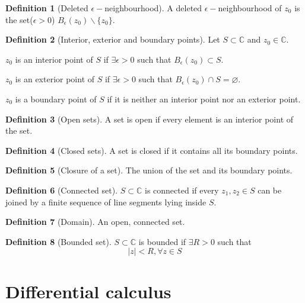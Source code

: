 \documentclass[10pt, a4paper]{extarticle}
\theoremstyle{definition}
\newtheorem{defn}{Definition}
\begin{document}
	\begin{defn}[Deleted $\epsilon-$neighbourhood]
	A deleted $\epsilon-$neighbourhood of $z_0$ is the set($\epsilon>0$) $B_\epsilon(z_0)\backslash\{z_0\}$.
	\end{defn}
	
	\begin{defn}[Interior, exterior and boundary points]
		Let $S\subset\mathbb{C}$ and $z_0\in\mathbb{C}$.

		$z_0$ is an interior point of $S$ if $\exists \epsilon>0$ such that $B_\epsilon(z_0)\subset S$.

		$z_0$ is an exterior point of $S$ if $\exists \epsilon>0$ such that $B_\epsilon(z_0)\cap S=\varnothing$.
		
		$z_0$ is a boundary point of $S$ if it is neither an interior point nor an exterior point.
	\end{defn}

	\begin{defn}[Open sets]
		A set is open if every element is an interior point of the set.
	\end{defn}
	\begin{defn}[Closed sets]
		A set is closed if it contains all its boundary points.
	\end{defn}
	\begin{defn}[Closure of a set]\label{closure}
		The union of the set and its boundary points.
	\end{defn}
	\begin{defn}[Connected set]
		$S\subset\mathbb{C}$ is connected if every $z_1,z_2\in S$ can be joined by a finite sequence of line segments lying inside $S$.
	\end{defn}
	\begin{defn}[Domain]
		An open, connected set.
	\end{defn}
	\begin{defn}[Bounded set]
		$S\subset\mathbb{C}$ is bounded if $\exists R>0$ such that\[|z|<R,\forall z\in S\]
	\end{defn}

	\section{Differential calculus}
\end{document}
